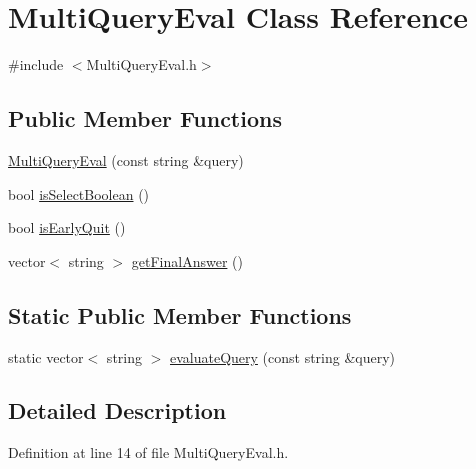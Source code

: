 \hypertarget{class_multi_query_eval}{\section{Multi\-Query\-Eval Class Reference}
\label{class_multi_query_eval}
}


{\ttfamily \#include $<$Multi\-Query\-Eval.\-h$>$}

\subsection*{Public Member Functions}
\begin{DoxyCompactItemize}
\item 
\hyperlink{class_multi_query_eval_a481834620df8ce6d15665edc212a3117}{Multi\-Query\-Eval} (const string \&query)
\item 
bool \hyperlink{class_multi_query_eval_ac2e6dda08c96c54c65c52048919c6387}{is\-Select\-Boolean} ()
\item 
bool \hyperlink{class_multi_query_eval_ae681859389cf10505a7ff1d13fd927b4}{is\-Early\-Quit} ()
\item 
vector$<$ string $>$ \hyperlink{class_multi_query_eval_a654afcc3d4de43ed97a7169212a44930}{get\-Final\-Answer} ()
\end{DoxyCompactItemize}
\subsection*{Static Public Member Functions}
\begin{DoxyCompactItemize}
\item 
static vector$<$ string $>$ \hyperlink{class_multi_query_eval_a161e8cba59f38392a59a71a21fb7672e}{evaluate\-Query} (const string \&query)
\end{DoxyCompactItemize}


\subsection{Detailed Description}


Definition at line 14 of file Multi\-Query\-Eval.\-h.



